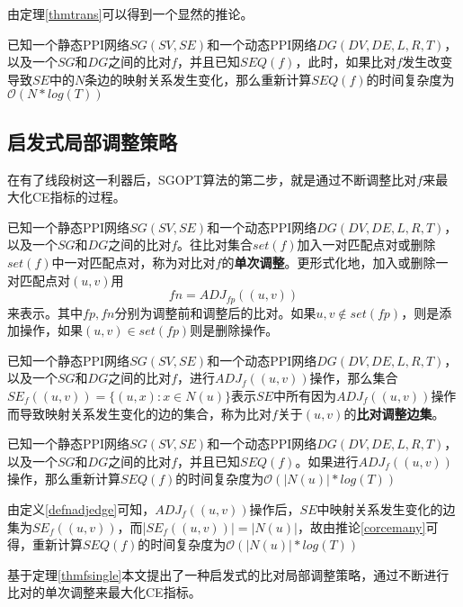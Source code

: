 由定理\ref{thmtrans}可以得到一个显然的推论。
\begin{cor}
\label{corcemany}
已知一个静态PPI网络$SG(SV,SE)$和一个动态PPI网络$DG(DV,DE,L,R,T)$，以及一个$SG$和$DG$之间的比对$f$，并且已知$SEQ(f)$，此时，如果比对$f$发生改变导致$SE$中的$N$条边的映射关系发生变化，那么重新计算$SEQ(f)$的时间复杂度为$\mathcal{O}(N*log(T))$
\end{cor}
\subsection{启发式局部调整策略}
在有了线段树这一利器后，SGOPT算法的第二步，就是通过不断调整比对$f$来最大化CE指标的过程。

\begin{defn}[比对单次调整]
\label{defnfsingle}
已知一个静态PPI网络$SG(SV,SE)$和一个动态PPI网络$DG(DV,DE,L,R,T)$，以及一个$SG$和$DG$之间的比对$f$。往比对集合$set(f)$加入一对匹配点对或删除$set(f)$中一对匹配点对，称为对比对$f$的\textbf{单次调整}。更形式化地，加入或删除一对匹配点对$(u,v)$用
$$fn=ADJ_{fp}((u,v))$$
来表示。其中$fp,fn$分别为调整前和调整后的比对。如果$u,v\notin set(fp)$，则是添加操作，如果$(u,v)\in set(fp)$则是删除操作。
\end{defn}

\begin{defn}[比对调整边集]
\label{defnadjedge}
已知一个静态PPI网络$SG(SV,SE)$和一个动态PPI网络$DG(DV,DE,L,R,T)$，以及一个$SG$和$DG$之间的比对$f$，进行$ADJ_f((u,v))$操作，那么集合$SE_f((u,v))=\{(u,x):x\in N(u)\}$表示$SE$中所有因为$ADJ_f((u,v))$操作而导致映射关系发生变化的边的集合，称为比对$f$关于$(u,v)$的\textbf{比对调整边集}。
\end{defn}

\begin{thm}[比对单次调整复杂度]
\label{thmfsingle}
已知一个静态PPI网络$SG(SV,SE)$和一个动态PPI网络$DG(DV,DE,L,R,T)$，以及一个$SG$和$DG$之间的比对$f$，并且已知$SEQ(f)$。如果进行$ADJ_f((u,v))$操作，那么重新计算$SEQ(f)$的时间复杂度为$\mathcal{O}(|N(u)|*log(T))$
\end{thm}
\begin{proof2}
由定义\ref{defnadjedge}可知，$ADJ_f((u,v))$操作后，$SE$中映射关系发生变化的边集为$SE_f((u,v))$，而|$SE_f((u,v))|=|N(u)|$，故由推论\ref{corcemany}可得，重新计算$SEQ(f)$的时间复杂度为$\mathcal{O}(|N(u)|*log(T))$
\end{proof2}

基于定理\ref{thmfsingle}本文提出了一种启发式的比对局部调整策略，通过不断进行比对的单次调整来最大化CE指标。

